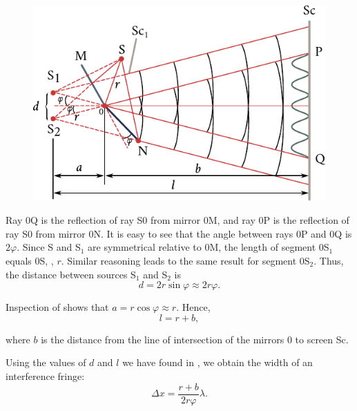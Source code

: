 \begin{figure}[!htb]
	\begin{center}
		\includegraphics[scale=0.98]{figures/ch_17/fig_17_8.pdf}
		\caption[]{}
		\label{fig:17_8}
	\end{center}
	\vspace{-0.9cm}
\end{figure}

Ray $0$Q is the reflection of ray S$0$ from mirror $0$M, and ray $0$P is the reflection of ray S$0$ from mirror $0$N.
It is easy to see that the angle between rays $0$P and $0$Q is $2\varphi$.
Since S and S$_1$ are symmetrical relative to $0$M, the length of segment $0$S$_1$ equals $0$S, \ie, $r$.
Similar reasoning leads to the same result for segment $0$S$_2$.
Thus, the distance between sources S$_1$ and S$_2$ is
\begin{equation*}
    d = 2r \sin\varphi \approx 2 r \varphi.
\end{equation*}

\noindent
Inspection of  shows that $a=r \cos\varphi \approx r$.
Hence,
\begin{equation*}
    l = r + b,
\end{equation*}

\noindent
where $b$ is the distance from the line of intersection of the mirrors $0$ to screen Sc.

Using the values of $d$ and $l$ we have found in , we obtain the width of an interference fringe:
\begin{equation}\label{eq:17_28}
    \Delta{x} = \frac{r + b}{2 r \varphi} \lambda.
\end{equation}

